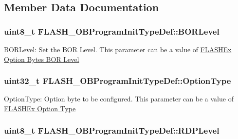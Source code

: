 \subsection{Member Data Documentation}
\hypertarget{struct_f_l_a_s_h___o_b_program_init_type_def_a14c9f3c032ca3073d0c33f0c2bf4d5f9}{
\subsubsection[{B\-O\-R\-Level}]{\setlength{\rightskip}{0pt plus 5cm}uint8\-\_\-t F\-L\-A\-S\-H\-\_\-\-O\-B\-Program\-Init\-Type\-Def\-::\-B\-O\-R\-Level}}\label{struct_f_l_a_s_h___o_b_program_init_type_def_a14c9f3c032ca3073d0c33f0c2bf4d5f9}
B\-O\-R\-Level\-: Set the B\-O\-R Level. This parameter can be a value of \hyperlink{group___f_l_a_s_h_ex___option___bytes___b_o_r___level}{F\-L\-A\-S\-H\-Ex Option Bytes B\-O\-R Level} \hypertarget{struct_f_l_a_s_h___o_b_program_init_type_def_a46bffc2a63ea02e15b9187856535d890}{
\subsubsection[{Option\-Type}]{\setlength{\rightskip}{0pt plus 5cm}uint32\-\_\-t F\-L\-A\-S\-H\-\_\-\-O\-B\-Program\-Init\-Type\-Def\-::\-Option\-Type}}\label{struct_f_l_a_s_h___o_b_program_init_type_def_a46bffc2a63ea02e15b9187856535d890}
Option\-Type\-: Option byte to be configured. This parameter can be a value of \hyperlink{group___f_l_a_s_h_ex___option___type}{F\-L\-A\-S\-H\-Ex Option Type} \hypertarget{struct_f_l_a_s_h___o_b_program_init_type_def_a165bbb65be0086a30b13895594d274b1}{
\subsubsection[{R\-D\-P\-Level}]{\setlength{\rightskip}{0pt plus 5cm}uint8\-\_\-t F\-L\-A\-S\-H\-\_\-\-O\-B\-Program\-Init\-Type\-Def\-::\-R\-D\-P\-Level}}\label{struct_f_l_a_s_h___o_b_program_init_type_def_a165bbb65be0086a30b13895594d274b1}
